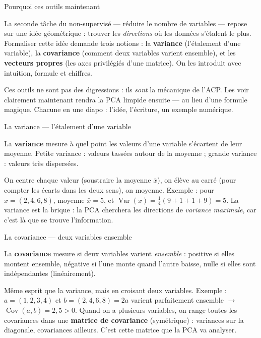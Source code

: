 \documentclass[aspectratio=169,11pt]{beamer}
\begin{document}
\begin{frame}{Pourquoi ces outils maintenant}
\begin{ucadfront}
{\small La seconde tâche du non-supervisé — réduire le nombre de variables — repose sur une idée géométrique : trouver les \emph{directions} où les données s'étalent le plus. Formaliser cette idée demande trois notions : la \textbf{variance} (l'étalement d'une variable), la \textbf{covariance} (comment deux variables varient ensemble), et les \textbf{vecteurs propres} (les axes privilégiés d'une matrice). On les introduit avec intuition, formule et chiffres.}
\end{ucadfront}
{\small Ces outils ne sont pas des digressions : ils \emph{sont} la mécanique de l'ACP. Les voir clairement maintenant rendra la PCA limpide ensuite — au lieu d'une formule magique. Chacune en une diapo : l'idée, l'écriture, un exemple numérique.}
\end{frame}

\begin{frame}{La variance — l'étalement d'une variable}
\begin{ucaddef}[Définition]
{\small La \textbf{variance} mesure à quel point les valeurs d'une variable s'écartent de leur moyenne. Petite variance : valeurs tassées autour de la moyenne ; grande variance : valeurs très dispersées.}
\end{ucaddef}
{\small On centre chaque valeur (soustraire la moyenne $\bar x$), on élève au carré (pour compter les écarts dans les deux sens), on moyenne. Exemple : pour $x = (2, 4, 6, 8)$, moyenne $\bar x = 5$, et $\operatorname{Var}(x) = \frac{1}{4}(9 + 1 + 1 + 9) = 5$. La variance est la brique : la PCA cherchera les directions de \emph{variance maximale}, car c'est là que se trouve l'information.}
\end{frame}

\begin{frame}{La covariance — deux variables ensemble}
\begin{ucaddef}[Définition]
{\small La \textbf{covariance} mesure si deux variables varient \emph{ensemble} : positive si elles montent ensemble, négative si l'une monte quand l'autre baisse, nulle si elles sont indépendantes (linéairement).}
\end{ucaddef}
{\small Même esprit que la variance, mais en croisant deux variables. Exemple : $a = (1,2,3,4)$ et $b = (2,4,6,8) = 2a$ varient parfaitement ensemble $\to$ $\operatorname{Cov}(a,b) = 2{,}5 > 0$. Quand on a plusieurs variables, on range toutes les covariances dans une \textbf{matrice de covariance} (symétrique) : variances sur la diagonale, covariances ailleurs. C'est cette matrice que la PCA va analyser.}
\end{frame}
\end{document}
